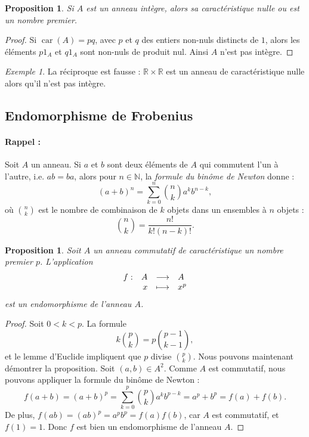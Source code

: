 \documentclass[a4paper, titlepage]{article}
\newtheorem{prop}[theo]{Proposition}
\theoremstyle{definition}
\theoremstyle{remark}
\newtheorem{exem}[theo]{Exemple}
\def\N{\mathbb N}
\def\R{\mathbb R}
\def\car{\operatorname{car}}
\begin{document}
\begin{prop}\label{caracIntegre}
Si $A$ est un anneau intègre, alors sa caractéristique nulle ou est un nombre premier.
\end{prop}

\begin{proof}
Si $\car(A) = pq$, avec $p$ et $q$ des entiers non-nuls distincts de $1$, alors les éléments $p1_A$ et $q1_A$ sont non-nuls de produit nul. Ainsi $A$ n'est pas intègre.
\end{proof}

\begin{exem}
La réciproque est fausse : $\R\times\R$ est un anneau de caractéristique nulle alors qu'il n'est pas intègre.
\end{exem}

\subsection{Endomorphisme de Frobenius}

\paragraph*{Rappel :} Soit $A$ un anneau. Si $a$ et $b$ sont deux éléments de $A$ qui commutent l'un à l'autre, i.e. $ab = ba$, alors pour $n \in \N$, la \textit{formule du binôme de Newton} donne :
$$(a+b)^n = \sum_{k=0}^n \binom{n}{k} a^kb^{n-k},$$
où $\binom{n}{k}$ est le nombre de combinaison de $k$ objets dans un ensembles à $n$ objets : $$\binom{n}{k} = \frac{n!}{k!(n-k)!}.$$

\begin{prop}\label{propFrob}
Soit $A$ un anneau commutatif de caractéristique un nombre premier $p$. L'application 
$$\begin{array}{r r c l}
 f :& A& \longrightarrow& A \\
 & x& \longmapsto& x^p
\end{array}$$
est un endomorphisme de l'anneau $A$.
\end{prop}

\begin{proof}
Soit $0 < k < p$. La formule 
$$k\binom{p}{k} = p\binom{p-1}{k-1},$$
et le lemme d'Euclide impliquent que $p$ divise $\binom{p}{k}$. Nous pouvons maintenant démontrer la proposition. Soit $(a,b) \in A^2$. Comme $A$ est commutatif, nous pouvons appliquer la formule du binôme de Newton :
$$f(a+b)=(a+b)^p = \sum_{k=0}^p \binom{p}{k} a^kb^{p-k} = a^p + b^p=f(a)+f(b).$$
De plus, $f(ab)=(ab)^p = a^pb^p=f(a)f(b)$, car $A$ est commutatif, et $f(1) = 1$. Donc $f$ est bien un endomorphisme de l'anneau $A$.
\end{proof}
\end{document}
